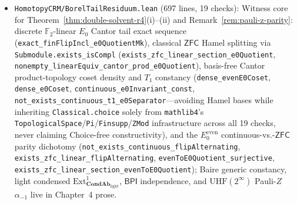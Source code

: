 \documentclass[10pt,twoside,openright]{book}
\theoremstyle{crmplain}
\theoremstyle{crmdef}
\theoremstyle{crmremark}
\begin{document}
\begin{itemize}[leftmargin=1.5em]
  \item \texttt{HomotopyCRM/\allowbreak BorelTailResiduum.lean} (697 lines, 19 checks): Witness core for Theorem~\ref{thm:double-solvent-r4}(i)--(ii) and Remark~\ref{rem:pauli-z-parity}: discrete $\mathbb{F}_2$-linear $E_0$ Cantor tail exact sequence (\texttt{exact\_\allowbreak finFlipIncl\_\allowbreak e0QuotientMk}), classical $\mathsf{ZFC}$ Hamel splitting via \texttt{Submodule.exists\_\allowbreak isCompl} (\texttt{exists\_\allowbreak zfc\_\allowbreak linear\_\allowbreak section\_\allowbreak e0Quotient}, \texttt{nonempty\_\allowbreak linearEquiv\_\allowbreak cantor\_\allowbreak prod\_\allowbreak e0Quotient}), basis-free Cantor product-topology coset density and $T_1$ constancy (\texttt{dense\_\allowbreak evenE0Coset}, \texttt{dense\_\allowbreak e0Coset}, \texttt{continuous\_\allowbreak e0Invariant\_\allowbreak const}, \texttt{not\_\allowbreak exists\_\allowbreak continuous\_\allowbreak t1\_\allowbreak e0Separator}---avoiding Hamel bases while inheriting \texttt{Classical.choice} solely from \texttt{mathlib4}'s \texttt{TopologicalSpace}/\texttt{Pi}/\texttt{Finsupp}/\texttt{ZMod} infrastructure across all 19 checks, never claiming Choice-free constructivity), and the $E_0^{\mathrm{even}}$ continuous-vs.-$\mathsf{ZFC}$ parity dichotomy (\texttt{not\_\allowbreak exists\_\allowbreak continuous\_\allowbreak flipAlternating}, \texttt{exists\_\allowbreak zfc\_\allowbreak linear\_\allowbreak flipAlternating}, \texttt{evenTo\allowbreak E0Quotient\_\allowbreak surjective}, \texttt{exists\_\allowbreak zfc\_\allowbreak linear\_\allowbreak section\_\allowbreak evenTo\allowbreak E0Quotient}); Baire generic constancy, light condensed $\mathrm{Ext}^1_{\mathbf{CondAb}_{\mathrm{light}}}$, $\mathsf{BPI}$ independence, and $\mathrm{UHF}(2^\infty)$ Pauli-$Z$ $\alpha_{-1}$ live in Chapter~4 prose.

\end{itemize}
\end{document}
